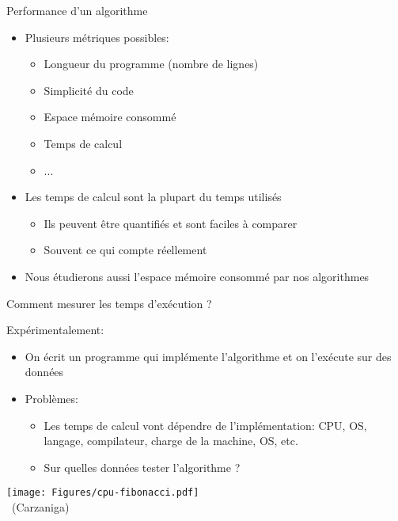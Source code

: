 \begin{frame}{Performance d'un algorithme}

\begin{itemize}
\item Plusieurs métriques possibles:
\begin{itemize}
\item Longueur du programme (nombre de lignes)
\item Simplicité du code
\item \alert{Espace mémoire consommé}
\item \alert{Temps de calcul}
\item ...
\end{itemize}

\bigskip

\item Les temps de calcul sont la plupart du temps utilisés
\begin{itemize}
\item Ils peuvent être quantifiés et sont faciles à comparer
\item Souvent ce qui compte réellement
\end{itemize}
\item Nous étudierons aussi l'espace mémoire consommé par nos algorithmes
\end{itemize}

\end{frame}

\begin{frame}{Comment mesurer les temps d'exécution ?}

Expérimentalement:
\begin{itemize}
\item On écrit un programme qui implémente l'algorithme et on l'exécute sur des données
\item Problèmes:
\begin{itemize}
\item Les temps de calcul vont dépendre de l'implémentation: CPU, OS, langage, compilateur, charge de la machine, OS, etc.
\item Sur quelles données tester l'algorithme ?
\end{itemize}
\end{itemize}

\begin{center}
\texttt{[image: Figures/cpu-fibonacci.pdf]}\\
~\hfill\scriptsize(Carzaniga)
\end{center}

\end{frame}

